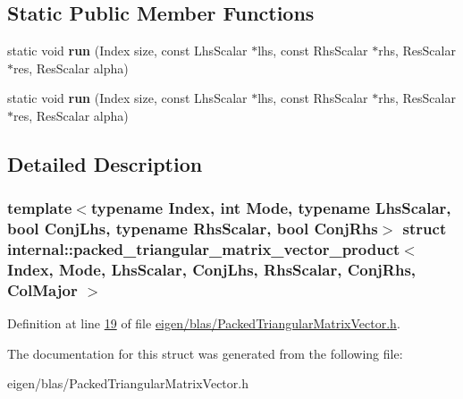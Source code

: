 \subsection*{Static Public Member Functions}
\begin{DoxyCompactItemize}
\item 
\mbox{\label{structinternal_1_1packed__triangular__matrix__vector__product_3_01_index_00_01_mode_00_01_lhs_scbd6db00b6d9348a4e2779e2616adcdaa_ad4a7898e84b5ed11d91407daf65e4843}} 
static void {\bfseries run} (Index size, const Lhs\+Scalar $\ast$lhs, const Rhs\+Scalar $\ast$rhs, Res\+Scalar $\ast$res, Res\+Scalar alpha)
\item 
\mbox{\label{structinternal_1_1packed__triangular__matrix__vector__product_3_01_index_00_01_mode_00_01_lhs_scbd6db00b6d9348a4e2779e2616adcdaa_ad4a7898e84b5ed11d91407daf65e4843}} 
static void {\bfseries run} (Index size, const Lhs\+Scalar $\ast$lhs, const Rhs\+Scalar $\ast$rhs, Res\+Scalar $\ast$res, Res\+Scalar alpha)
\end{DoxyCompactItemize}


\subsection{Detailed Description}
\subsubsection*{template$<$typename Index, int Mode, typename Lhs\+Scalar, bool Conj\+Lhs, typename Rhs\+Scalar, bool Conj\+Rhs$>$\newline
struct internal\+::packed\+\_\+triangular\+\_\+matrix\+\_\+vector\+\_\+product$<$ Index, Mode, Lhs\+Scalar, Conj\+Lhs, Rhs\+Scalar, Conj\+Rhs, Col\+Major $>$}



Definition at line \hyperlink{eigen_2blas_2_packed_triangular_matrix_vector_8h_source_l00019}{19} of file \hyperlink{eigen_2blas_2_packed_triangular_matrix_vector_8h_source}{eigen/blas/\+Packed\+Triangular\+Matrix\+Vector.\+h}.



The documentation for this struct was generated from the following file\+:\begin{DoxyCompactItemize}
\item 
eigen/blas/\+Packed\+Triangular\+Matrix\+Vector.\+h\end{DoxyCompactItemize}
